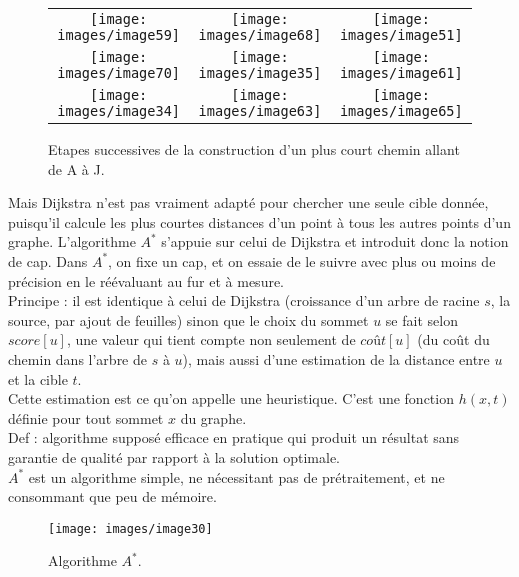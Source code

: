 \documentclass{article}
\begin{document}
\begin{figure}[h]
  \centering
  \begin{tabular}{ccc}
  \texttt{[image: images/image59]} &
  \texttt{[image: images/image68]} &
  \texttt{[image: images/image51]} \\
  \texttt{[image: images/image70]} &
  \texttt{[image: images/image35]} &
  \texttt{[image: images/image61]} \\
  \texttt{[image: images/image34]} &
  \texttt{[image: images/image63]} &
  \texttt{[image: images/image65]}
  \end{tabular}
  \caption{Etapes successives de la construction d'un plus court chemin allant de A à J.}
  \label{etapes}
\end{figure}

Mais Dijkstra n’est pas vraiment adapté pour chercher une seule cible donnée, puisqu'il calcule les plus courtes distances d’un point à tous les autres points d’un graphe. L'algorithme $A^*$ s’appuie sur celui de Dijkstra et introduit donc la notion de cap. Dans $A^*$, on fixe un cap, et on essaie de le suivre avec plus ou moins de précision en le réévaluant au fur et à mesure. \\
Principe : il est identique à celui de Dijkstra (croissance d’un arbre de racine $s$, la source, par ajout de feuilles) sinon que le choix du sommet $u$ se fait selon $score[u]$, une valeur qui tient compte non seulement de $coût[u]$ (du coût du chemin dans l’arbre de $s$ à $u$), mais aussi d’une estimation de la distance entre $u$ et la cible $t$. \\
Cette estimation est ce qu’on appelle une heuristique. C’est une fonction $h(x,t)$ définie pour tout sommet $x$ du graphe. \\
Def : algorithme supposé efficace en pratique qui produit un résultat sans garantie de qualité par rapport à la solution optimale. \\
$A^*$ est un algorithme simple, ne nécessitant pas de prétraitement, et ne consommant que peu de mémoire. 

\begin{figure}[h]
  \centering
  \texttt{[image: images/image30]}
  \caption{Algorithme $A^*$.}
\end{figure}
\end{document}
